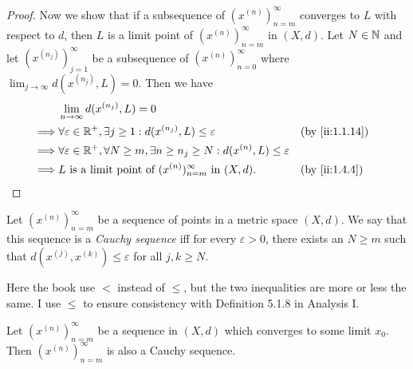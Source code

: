 \begin{proof}
  Now we show that if a subsequence of \((x^{(n)})_{n = m}^\infty\) converges to \(L\) with respect to \(d\), then \(L\) is a limit point of \((x^{(n)})_{n = m}^\infty\) in \((X, d)\).
  Let \(N \in \mathbb{N}\) and let \((x^{(n_j)})_{j = 1}^\infty\) be a subsequence of \((x^{(n)})_{n = 0}^\infty\) where \(\lim_{j \to \infty} d(x^{(n_j)}, L) = 0\).
  Then we have
  \begin{align*}
             & \lim_{n \to \infty} d(x^{(n_j)}, L) = 0                                                                                         \\
    \implies & \forall \varepsilon \in \R^+, \exists j \geq 1 : d(x^{(n_j)}, L) \leq \varepsilon                           &  & \by{ii:1.1.14} \\
    \implies & \forall \varepsilon \in \R^+,  \forall N \geq m, \exists n \geq n_j \geq N : d(x^{(n)}, L) \leq \varepsilon                     \\
    \implies & L \text{ is a limit point of } (x^{(n)})_{n = m}^\infty \text{ in } (X, d).                                 &  & \by{ii:1.4.4}
  \end{align*}
\end{proof}

\begin{defn}\label{ii:1.4.6}
  Let \((x^{(n)})_{n = m}^\infty\) be a sequence of points in a metric space \((X, d)\).
  We say that this sequence is a \emph{Cauchy sequence} iff for every \(\varepsilon > 0\), there exists an \(N \geq m\) such that \(d(x^{(j)}, x^{(k)}) \leq \varepsilon\) for all \(j, k \geq N\).
\end{defn}

\begin{note}
  Here the book use \(<\) instead of \(\leq\), but the two inequalities are more or less the same.
  I use \(\leq\) to ensure consistency with Definition 5.1.8 in Analysis I.
\end{note}

\begin{lem}\label{ii:1.4.7}
  Let \((x^{(n)})_{n = m}^\infty\) be a sequence in \((X, d)\) which converges to some limit \(x_0\).
  Then \((x^{(n)})_{n = m}^\infty\) is also a Cauchy sequence.
\end{lem}

